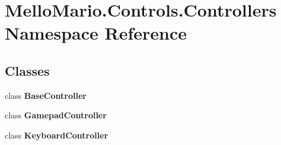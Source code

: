 \section{Mello\+Mario.\+Controls.\+Controllers Namespace Reference}
\label{namespaceMelloMario_1_1Controls_1_1Controllers}
\subsection*{Classes}
\begin{DoxyCompactItemize}
\item 
class \textbf{ Base\+Controller}
\item 
class \textbf{ Gamepad\+Controller}
\item 
class \textbf{ Keyboard\+Controller}
\end{DoxyCompactItemize}
